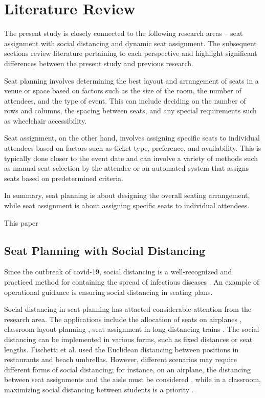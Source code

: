 \section{Literature Review}

The present study is closely connected to the following research areas -- seat assignment with social distancing and dynamic seat assignment. The subsequent sections review literature pertaining to each perspective and highlight significant differences between the present study and previous research.


Seat planning involves determining the best layout and arrangement of seats in a venue or space based on factors such as the size of the room, the number of attendees, and the type of event. This can include deciding on the number of rows and columns, the spacing between seats, and any special requirements such as wheelchair accessibility.

Seat assignment, on the other hand, involves assigning specific seats to individual attendees based on factors such as ticket type, preference, and availability. This is typically done closer to the event date and can involve a variety of methods such as manual seat selection by the attendee or an automated system that assigns seats based on predetermined criteria.

In summary, seat planning is about designing the overall seating arrangement, while seat assignment is about assigning specific seats to individual attendees.


\cite{blom2022filling} This paper 


\subsection{Seat Planning with Social Distancing}
Since the outbreak of covid-19, social distancing is a well-recognized and practiced method for containing the spread of infectious diseases \cite{moosa2020effectiveness}. An example of operational guidance is ensuring social distancing in seating plans.

Social distancing in seat planning has attacted considerable attention from the research area. The applications include the allocation of seats on airplanes \cite{ghorbani2020model}, classroom layout planning \cite{bortolete2022support}, seat assignment in long-distancing trains \cite{haque2022optimization}. The social distancing can be implemented in various forms, such as fixed distances or seat lengths. Fischetti et al.\cite{fischetti2021safe} used the Euclidean distancing between positions in restaurants and beach umbrellas. However, different scenarios may require different forms of social distancing; for instance, on an airplane, the distancing between seat assignments and the aisle must be considered \cite{salari2022social}, while in a classroom, maximizing social distancing between students is a priority \cite{bortolete2022support}.


